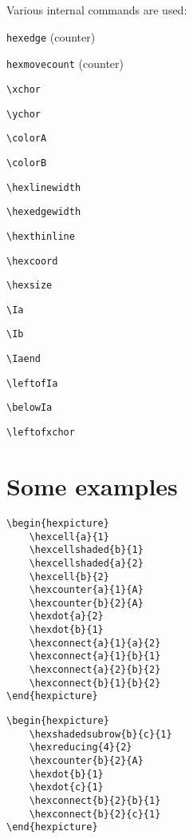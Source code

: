 \documentclass[a4paper,12pt]{article}
\begin{document}
    Various internal commands are used:
    
    \verb|hexedge| (counter)
    
    \verb|hexmovecount| (counter)
    
	\verb|\xchor|
    
	\verb|\ychor|
    
	\verb|\colorA|
    
	\verb|\colorB|
    
	\verb|\hexlinewidth|
    
	\verb|\hexedgewidth|
    
	\verb|\hexthinline|
    
	\verb|\hexcoord|
    
	\verb|\hexsize|
    
	\verb|\Ia|
    
	\verb|\Ib|
    
	\verb|\Iaend|
    
	\verb|\leftofIa|
    
	\verb|\belowIa|
    
	\verb|\leftofxchor|
    
    \section{Some examples}
    
    \begin{verbatim}\begin{hexpicture}
    \hexcell{a}{1}
    \hexcellshaded{b}{1}
    \hexcellshaded{a}{2}
    \hexcell{b}{2}
    \hexcounter{a}{1}{A}
    \hexcounter{b}{2}{A}
    \hexdot{a}{2}
    \hexdot{b}{1}
    \hexconnect{a}{1}{a}{2}
    \hexconnect{a}{1}{b}{1}
    \hexconnect{a}{2}{b}{2}
    \hexconnect{b}{1}{b}{2}
\end{hexpicture}\end{verbatim}
    
    \begin{hexpicture}
    \end{hexpicture}
    
    \begin{verbatim}\begin{hexpicture}
    \hexshadedsubrow{b}{c}{1}
    \hexreducing{4}{2}
    \hexcounter{b}{2}{A}
    \hexdot{b}{1}
    \hexdot{c}{1}
    \hexconnect{b}{2}{b}{1}
    \hexconnect{b}{2}{c}{1}
\end{hexpicture}\end{verbatim}
    
\end{document}
